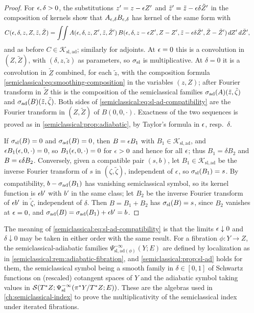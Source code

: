 \begin{proof}
  For $\epsilon,\delta>0$, the substitutions $z'=z-\epsilon Z'$ and $\tilde z'=\tilde z-\epsilon\delta\tilde Z'$ in the
  composition of kernels show that $A_{\epsilon,\delta}B_{\epsilon,\delta}$ has kernel of the same form
  with
  \begin{equation*}
    C(\epsilon,\delta,z,Z,\tilde z,\tilde Z)=\int\!\!\int A(\epsilon,\delta,z,Z',\tilde z,\tilde Z')\,
    B(\epsilon,\delta,z-\epsilon Z',Z-Z',\tilde z-\epsilon\delta\tilde Z',\tilde Z-\tilde Z')\,dZ'\,d\tilde Z',
  \end{equation*}
  and as before $C\in\mathcal K_{\mathrm{sl,ad}}$; similarly for adjoints. At $\epsilon=0$
  this is a convolution in $(Z,\tilde Z)$, with $(\delta,z,\tilde z)$ as parameters, so
  $\sigma_{\mathrm{sl}}$ is multiplicative. At $\delta=0$ it is a convolution in $\tilde Z$ combined, for
  each $\tilde z$, with the composition formula
  \eqref{semiclassical:eq:smoothing-composition} in the variables $(z,Z)$; after
  Fourier transform in $\tilde Z$ this is the composition of the semiclassical families
  $\sigma_{\mathrm{ad}}(A)(\tilde z,\tilde\zeta)$ and $\sigma_{\mathrm{ad}}(B)(\tilde z,\tilde\zeta)$. Both sides of
  \eqref{semiclassical:eq:sl-ad-compatibility} are the Fourier transform in $(Z,\tilde Z)$ of
  $B(0,0,\cdot)$. Exactness of the two sequences is proved as in
  \cref{semiclassical:prop:adiabatic}, by Taylor's formula in $\epsilon$, resp.\ $\delta$.

  If $\sigma_{\mathrm{sl}}(B)=0$ and $\sigma_{\mathrm{ad}}(B)=0$, then $B=\epsilon B_1$ with $B_1\in\mathcal K_{\mathrm{sl,ad}}$, and
  $\epsilon B_1(\epsilon,0,\cdot)=0$, so $B_1(\epsilon,0,\cdot)=0$ for $\epsilon>0$ and hence for all $\epsilon$;
  thus $B_1=\delta B_2$ and $B=\epsilon\delta B_2$. Conversely, given a compatible pair $(s,b)$,
  let $B_1\in\mathcal K_{\mathrm{sl,ad}}$ be the inverse Fourier transform of $s$ in $(\zeta,\tilde\zeta)$,
  independent of $\epsilon$, so $\sigma_{\mathrm{sl}}(B_1)=s$. By compatibility,
  $b-\sigma_{\mathrm{ad}}(B_1)$ has vanishing semiclassical symbol, so its kernel function is
  $\epsilon b'$ with $b'$ in the same class; let $B_2$ be the inverse Fourier transform of
  $\epsilon b'$ in $\tilde\zeta$, independent of $\delta$. Then $B=B_1+B_2$ has $\sigma_{\mathrm{sl}}(B)=s$, since
  $B_2$ vanishes at $\epsilon=0$, and $\sigma_{\mathrm{ad}}(B)=\sigma_{\mathrm{ad}}(B_1)+\epsilon b'=b$.
\end{proof}

The meaning of \eqref{semiclassical:eq:sl-ad-compatibility} is that the limits
$\epsilon\downarrow0$ and $\delta\downarrow0$ may be taken in either order with the same result. For
a fibration $\phi:Y\to Z$, the semiclassical-adiabatic families
$\Psi^{-\infty}_{\mathrm{sl,ad}(\phi)}(Y;E)$ are defined by localization as in
\cref{semiclassical:rem:adiabatic-fibration}, and
\cref{semiclassical:prop:sl-ad} holds for them, the semiclassical symbol being a
smooth family in $\delta\in[0,1]$ of Schwartz functions on (rescaled) cotangent spaces
of $Y$ and the adiabatic symbol taking values in
$\mathcal{S}(T^*Z;\Psi^{-\infty}_{\mathrm{sl}}(\pi^*Y/T^*Z;E))$. These are the algebras used in
\cref{ch:semiclassical-index} to prove the multiplicativity of the semiclassical
index under iterated fibrations.

